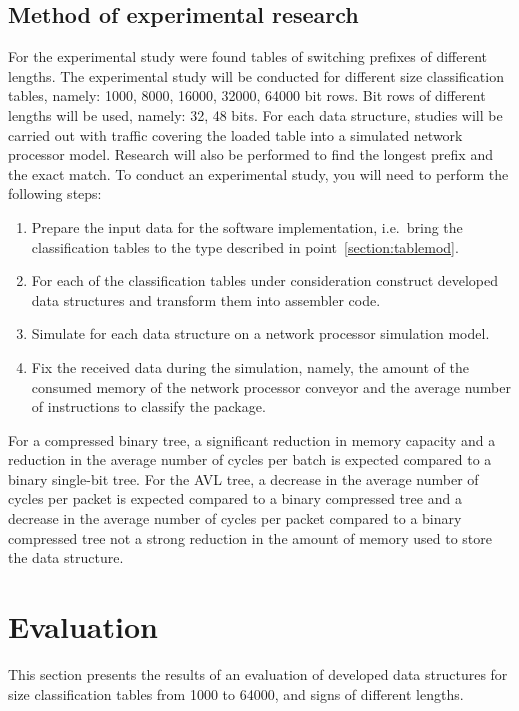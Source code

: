 \documentclass[conference]{IEEEtran}
\begin{document}
        \subsection{Method of experimental research}
            For the experimental study were found tables of switching prefixes of different lengths. 
            The experimental study will be conducted for different size classification tables, 
            namely: 1000, 8000, 16000, 32000, 64000 bit rows. Bit rows of different lengths will be used, namely:
            32, 48 bits. For each data structure, studies will be carried out with traffic 
            covering the loaded table into a simulated network processor model.
            Research will also be performed to find the longest prefix and the exact match.
            To conduct an experimental study, you will need to perform the following steps:
            \begin{enumerate}
                \item Prepare the input data for the software implementation, 
                    i.e.\ bring the classification tables to the type described in point~\ref{section:tablemod}.
                \item For each of the classification tables under consideration construct 
                    developed data structures and transform them into assembler code.
                \item Simulate for each data structure on a network processor simulation model.
                \item Fix the received data during the simulation, namely, 
                    the amount of the consumed memory of the network processor conveyor 
                    and the average number of instructions to classify the package.
            \end{enumerate}

            For a compressed binary tree, a significant reduction in memory capacity 
            and a reduction in the average number of cycles per batch is expected
            compared to a binary single-bit tree.
            For the AVL tree, a decrease in the average number of cycles per packet 
            is expected compared to a binary compressed tree and a decrease 
            in the average number of cycles per packet compared to a binary compressed tree
            not a strong reduction in the amount of memory used to store the data structure.
    \section{Evaluation}
        This section presents the results of an evaluation of developed data structures 
        for size classification tables from 1000 to 64000, and signs of different lengths.
\end{document}
